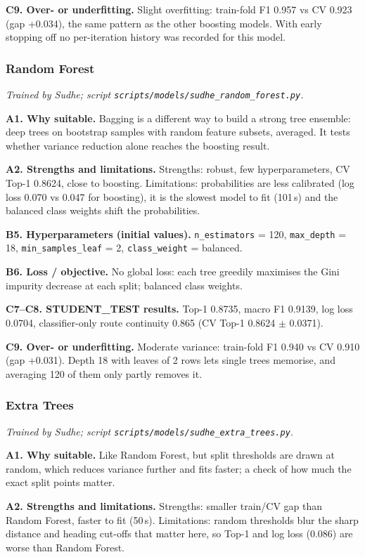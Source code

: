 \documentclass[11pt,a4paper]{article}
\begin{document}
\textbf{C9. Over- or underfitting.} Slight overfitting: train-fold F1 0.957 vs CV 0.923 (gap +0.034), the same pattern as the other boosting models. With early stopping off no per-iteration history was recorded for this model.
\subsubsection{Random Forest}
\textit{Trained by Sudhe; script \texttt{scripts/models/sudhe\_random\_forest.py}.}

\textbf{A1. Why suitable.} Bagging is a different way to build a strong tree ensemble: deep trees on bootstrap samples with random feature subsets, averaged. It tests whether variance reduction alone reaches the boosting result.

\textbf{A2. Strengths and limitations.} Strengths: robust, few hyperparameters, CV Top-1 0.8624, close to boosting. Limitations: probabilities are less calibrated (log loss 0.070 vs 0.047 for boosting), it is the slowest model to fit (101\,s) and the balanced class weights shift the probabilities.

\textbf{B5. Hyperparameters (initial values).} \texttt{n\_estimators} = 120, \texttt{max\_depth} = 18, \texttt{min\_samples\_leaf} = 2, \texttt{class\_weight} = balanced.

\textbf{B6. Loss / objective.} No global loss: each tree greedily maximises the Gini impurity decrease at each split; balanced class weights.

\textbf{C7--C8. STUDENT\_TEST results.} Top-1 0.8735, macro F1 0.9139, log loss 0.0704, classifier-only route continuity 0.865 (CV Top-1 0.8624 $\pm$ 0.0371).

\textbf{C9. Over- or underfitting.} Moderate variance: train-fold F1 0.940 vs CV 0.910 (gap +0.031). Depth 18 with leaves of 2 rows lets single trees memorise, and averaging 120 of them only partly removes it.
\subsubsection{Extra Trees}
\textit{Trained by Sudhe; script \texttt{scripts/models/sudhe\_extra\_trees.py}.}

\textbf{A1. Why suitable.} Like Random Forest, but split thresholds are drawn at random, which reduces variance further and fits faster; a check of how much the exact split points matter.

\textbf{A2. Strengths and limitations.} Strengths: smaller train/CV gap than Random Forest, faster to fit (50\,s). Limitations: random thresholds blur the sharp distance and heading cut-offs that matter here, so Top-1 and log loss (0.086) are worse than Random Forest.
\end{document}
